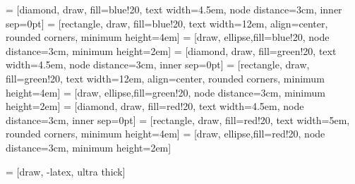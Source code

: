 %
%


 = [diamond, draw, fill=blue!20, 
    text width=4.5em, node distance=3cm, inner sep=0pt]
 = [rectangle, draw, fill=blue!20, 
    text width=12em, align=center, rounded corners, minimum height=4em]
 = [draw, ellipse,fill=blue!20, node distance=3cm,
    minimum height=2em]
 = [diamond, draw, fill=green!20, 
    text width=4.5em, node distance=3cm, inner sep=0pt]
 = [rectangle, draw, fill=green!20, 
    text width=12em, align=center, rounded corners, minimum height=4em]
 = [draw, ellipse,fill=green!20, node distance=3cm,
    minimum height=2em]
 = [diamond, draw, fill=red!20, 
    text width=4.5em, node distance=3cm, inner sep=0pt]
 = [rectangle, draw, fill=red!20, 
    text width=5em, rounded corners, minimum height=4em]
 = [draw, ellipse,fill=red!20, node distance=3cm,
    minimum height=2em]

 = [draw, -latex, ultra thick]

